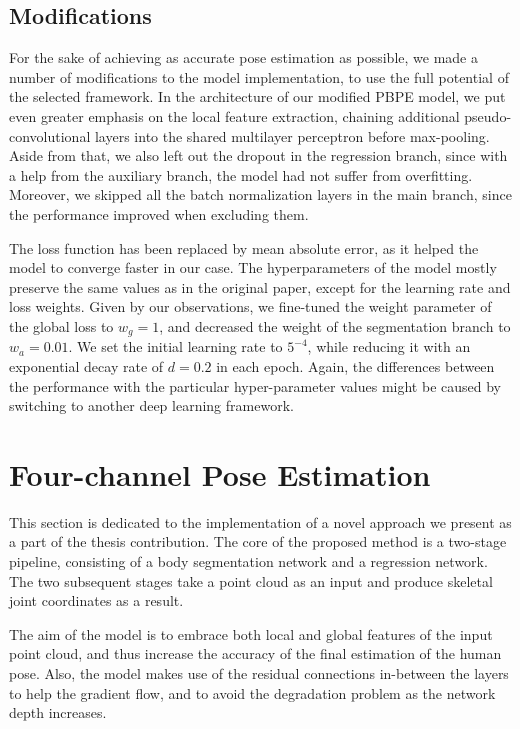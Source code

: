 \subsection{Modifications}
For the sake of achieving as accurate pose estimation as possible, we made a number of modifications to the model implementation, to use the full potential of the selected framework. In the architecture of our modified PBPE model, we put even greater emphasis on the local feature extraction, chaining additional pseudo-convolutional layers into the shared multilayer perceptron before max-pooling. Aside from that, we also left out the dropout in the regression branch, since with a help from the auxiliary branch, the model had not suffer from overfitting. Moreover, we skipped all the batch normalization layers in the main branch, since the performance improved when excluding them.\par
\vspace{5mm}
\noindent
The loss function has been replaced by mean absolute error, as it helped the model to converge faster in our case. The hyperparameters of the model mostly preserve the same values as in the original paper, except for the learning rate and loss weights. Given by our observations, we fine-tuned the weight parameter of the global loss to $w_g=1$, and decreased the weight of the segmentation branch to $w_a = 0.01$. We set the initial learning rate to $5^{-4}$, while reducing it with an exponential decay rate of $d = 0.2$ in each epoch. Again, the differences between the performance with the particular hyper-parameter values might be caused by switching to another deep learning framework. 


\section{Four-channel Pose Estimation} %

This section is dedicated to the implementation of a novel approach we present as a part of the thesis contribution. The core of the proposed method is a two-stage pipeline, consisting of a body segmentation network and a regression network. The two subsequent stages take a point cloud as an input and produce skeletal joint coordinates as a result.\par
\vspace{5mm}
\noindent The aim of the model is to embrace both local and global features of the input point cloud, and thus increase the accuracy of the final estimation of the human pose. Also, the model makes use of the residual connections in-between the layers to help the gradient flow, and to avoid the degradation problem as the network depth increases.


